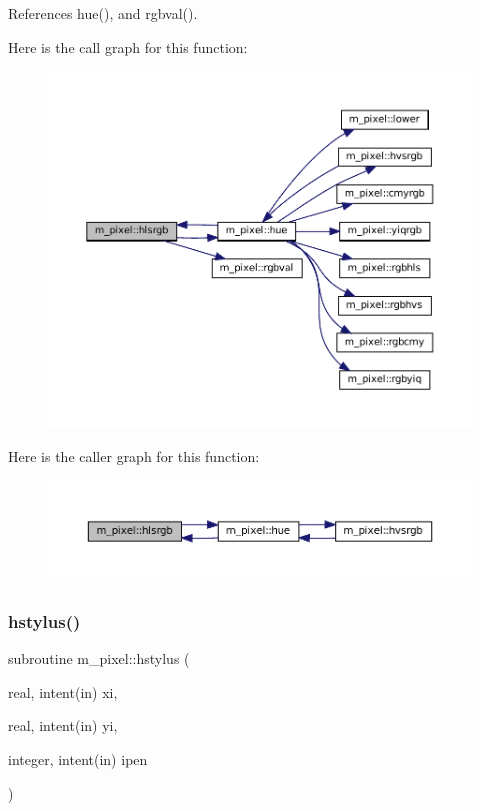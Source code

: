 References hue(), and rgbval().

Here is the call graph for this function\+:
\nopagebreak
\begin{figure}[H]
\begin{center}
\leavevmode
\includegraphics[width=350pt]{namespacem__pixel_a854b4980c2694d7c33b2830a225eeca0_cgraph}
\end{center}
\end{figure}
Here is the caller graph for this function\+:
\nopagebreak
\begin{figure}[H]
\begin{center}
\leavevmode
\includegraphics[width=350pt]{namespacem__pixel_a854b4980c2694d7c33b2830a225eeca0_icgraph}
\end{center}
\end{figure}
\mbox{\label{namespacem__pixel_a15c5daa9ab477991c2c6e17741cf40eb}} 
\subsubsection{\texorpdfstring{hstylus()}{hstylus()}}
{\footnotesize\ttfamily subroutine m\+\_\+pixel\+::hstylus (\begin{DoxyParamCaption}\item[{real, intent(in)}]{xi,  }\item[{real, intent(in)}]{yi,  }\item[{integer, intent(in)}]{ipen }\end{DoxyParamCaption})\hspace{0.3cm}{\ttfamily [private]}}



